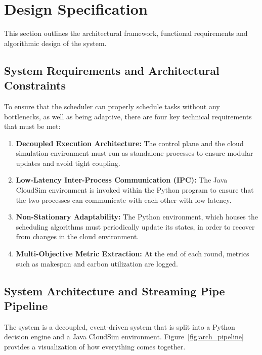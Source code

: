 
\section{Design Specification}
\label{sec:Design}
This section outlines the architectural framework, functional requirements and algorithmic design of the system.

\subsection{System Requirements and Architectural Constraints}
To ensure that the scheduler can properly schedule tasks without any bottlenecks, as well as being adaptive, there are four key technical requirements that must be met:
\begin{enumerate}
    \item \textbf{Decoupled Execution Architecture:} The control plane and the cloud simulation environment must run as standalone processes to ensure modular updates and avoid tight coupling.
    \item \textbf{Low-Latency Inter-Process Communication (IPC):} The Java CloudSim environment is invoked within the Python program to ensure that the two processes can communicate with each other with low latency.
    \item \textbf{Non-Stationary Adaptability:} The Python environment, which houses the scheduling algorithms must periodically update its states, in order to recover from changes in the cloud environment.
    \item \textbf{Multi-Objective Metric Extraction:} At the end of each round, metrics such as makespan and carbon utilization are logged.
\end{enumerate}

\subsection{System Architecture and Streaming Pipe Pipeline}
The system is a decoupled, event-driven system that is split into a Python decision engine and a Java CloudSim environment. Figure~\ref{fig:arch_pipeline} provides a visualization of how everything comes together.

